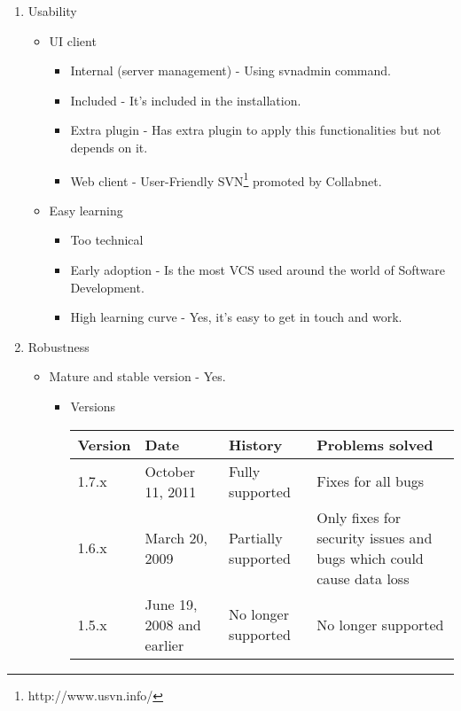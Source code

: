 \documentclass[11pt]{scrartcl}
\begin{document}
\begin{enumerate}
    \item Usability
        \begin{itemize}
	    \item UI client
        	\begin{itemize}
                \item Internal (server management) - Using svnadmin command.
                \item Included - It's included in the installation.
                \item Extra plugin - Has extra plugin to apply this functionalities but not depends on it.
                \item Web client - User-Friendly SVN\footnote{http://www.usvn.info/} promoted by Collabnet.
            \end{itemize}

	    \item Easy learning
        	\begin{itemize}
                \item Too technical 
                \item Early adoption - Is the most VCS used around the world of Software Development.
                \item High learning curve - Yes, it's easy to get in touch and work.
            \end{itemize}
        \end{itemize}

    \item Robustness

        \begin{itemize}
	    \item Mature and stable version - Yes.
	        \begin{itemize}
            \item Versions

                \begin{tabular}{|l|l|l|l|}
                    \hline
	                    {\bf Version} & {\bf Date} & {\bf History} & {\bf Problems solved}\\
                    \hline
	                    1.7.x & October 11, 2011 & Fully supported & Fixes for all bugs\\
                    \hline
	                    1.6.x & March 20, 2009 & Partially supported & Only fixes for security issues and bugs which could cause data loss\\
                    \hline
	                    1.5.x & June 19, 2008 and earlier & No longer supported & No longer supported\\
                    \hline
                \end{tabular}


\end{itemize}
\end{itemize}
\end{enumerate}
\end{document}
